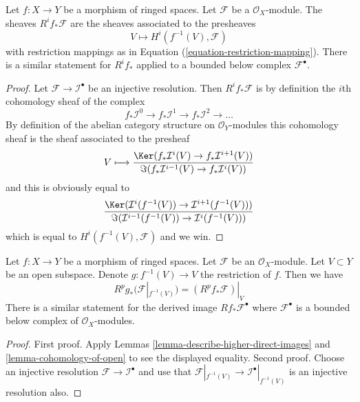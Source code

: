 \begin{lemma}
\label{lemma-describe-higher-direct-images}
Let $f : X \to Y$ be a morphism of ringed spaces.
Let $\mathcal{F}$ be a $\mathcal{O}_X$-module.
The sheaves $R^if_*\mathcal{F}$ are the sheaves
associated to the presheaves
$$
V \longmapsto H^i(f^{-1}(V), \mathcal{F})
$$
with restriction mappings as in Equation (\ref{equation-restriction-mapping}).
There is a similar statement for $R^if_*$ applied to a
bounded below complex $\mathcal{F}^\bullet$.
\end{lemma}

\begin{proof}
Let $\mathcal{F} \to \mathcal{I}^\bullet$ be an injective resolution.
Then $R^if_*\mathcal{F}$ is by definition the $i$th cohomology sheaf
of the complex
$$
f_*\mathcal{I}^0 \to f_*\mathcal{I}^1 \to f_*\mathcal{I}^2 \to \ldots
$$
By definition of the abelian category structure on $\mathcal{O}_Y$-modules
this cohomology sheaf is the sheaf associated to the presheaf
$$
V
\longmapsto
\frac{\Ker(f_*\mathcal{I}^i(V) \to f_*\mathcal{I}^{i + 1}(V))}
{\Im(f_*\mathcal{I}^{i - 1}(V) \to f_*\mathcal{I}^i(V))}
$$
and this is obviously equal to
$$
\frac{\Ker(\mathcal{I}^i(f^{-1}(V)) \to \mathcal{I}^{i + 1}(f^{-1}(V)))}
{\Im(\mathcal{I}^{i - 1}(f^{-1}(V)) \to \mathcal{I}^i(f^{-1}(V)))}
$$
which is equal to $H^i(f^{-1}(V), \mathcal{F})$
and we win.
\end{proof}

\begin{lemma}
\label{lemma-localize-higher-direct-images}
Let $f : X \to Y$ be a morphism of ringed spaces.
Let $\mathcal{F}$ be an $\mathcal{O}_X$-module.
Let $V \subset Y$ be an open subspace.
Denote $g : f^{-1}(V) \to V$ the restriction of $f$.
Then we have
$$
R^pg_*(\mathcal{F}|_{f^{-1}(V)}) = (R^pf_*\mathcal{F})|_V
$$
There is a similar statement for the
derived image $Rf_*\mathcal{F}^\bullet$ where $\mathcal{F}^\bullet$
is a bounded below complex of $\mathcal{O}_X$-modules.
\end{lemma}

\begin{proof}
First proof. Apply Lemmas \ref{lemma-describe-higher-direct-images}
and \ref{lemma-cohomology-of-open} to see the displayed equality.
Second proof. Choose an injective resolution
$\mathcal{F} \to \mathcal{I}^\bullet$
and use that $\mathcal{F}|_{f^{-1}(V)} \to \mathcal{I}^\bullet|_{f^{-1}(V)}$
is an injective resolution also.
\end{proof}

